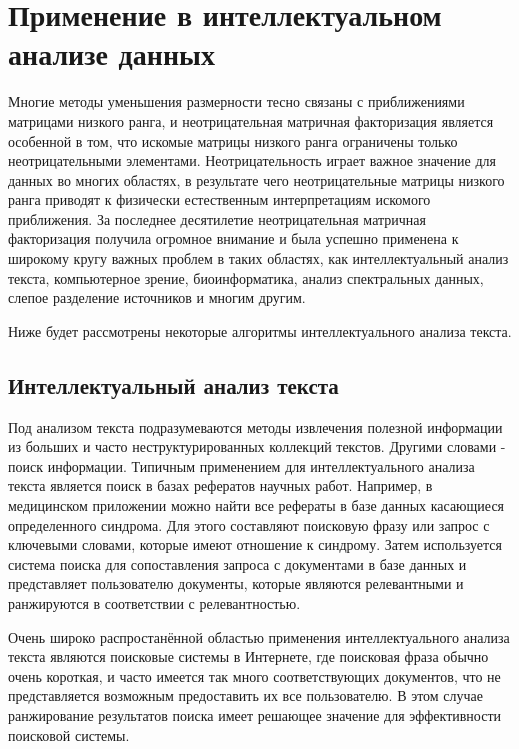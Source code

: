 
\newpage
\chapter{Применение в интеллектуальном анализе данных}

Многие методы уменьшения размерности тесно связаны с приближениями матрицами низкого ранга,
и неотрицательная матричная факторизация является особенной в том,
что искомые матрицы низкого ранга ограничены только неотрицательными элементами.
Неотрицательность играет важное значение для данных во многих областях,
в результате чего неотрицательные матрицы низкого ранга приводят к физически естественным интерпретациям искомого приближения.
За последнее десятилетие неотрицательная матричная факторизация получила огромное внимание и была успешно применена к широкому кругу важных проблем в таких областях,
как интеллектуальный анализ текста, компьютерное зрение, биоинформатика, анализ спектральных данных, слепое разделение источников и многим другим.

Ниже будет рассмотрены некоторые алгоритмы интеллектуального анализа текста.





\newpage





\section{Интеллектуальный анализ текста}

Под анализом текста подразумеваются методы извлечения полезной информации из больших и часто неструктурированных коллекций текстов.
Другими словами - поиск информации.
Типичным применением для интеллектуального анализа текста является поиск в базах рефератов научных работ.
Например, в медицинском приложении можно найти все рефераты в базе данных касающиеся определенного синдрома.
Для этого составляют поисковую фразу или запрос с ключевыми словами, которые имеют отношение к синдрому.
Затем используется система поиска для сопоставления запроса с документами в базе данных и представляет пользователю документы,
которые являются релевантными и ранжируются в соответствии с релевантностью.

Очень широко распростанённой областью применения интеллектуального анализа текста
являются поисковые системы в Интернете, где поисковая фраза обычно очень короткая,
и часто имеется так много соответствующих документов, что не представляется возможным предоставить их все пользователю.
В этом случае ранжирование результатов поиска имеет решающее значение для эффективности поисковой системы.

